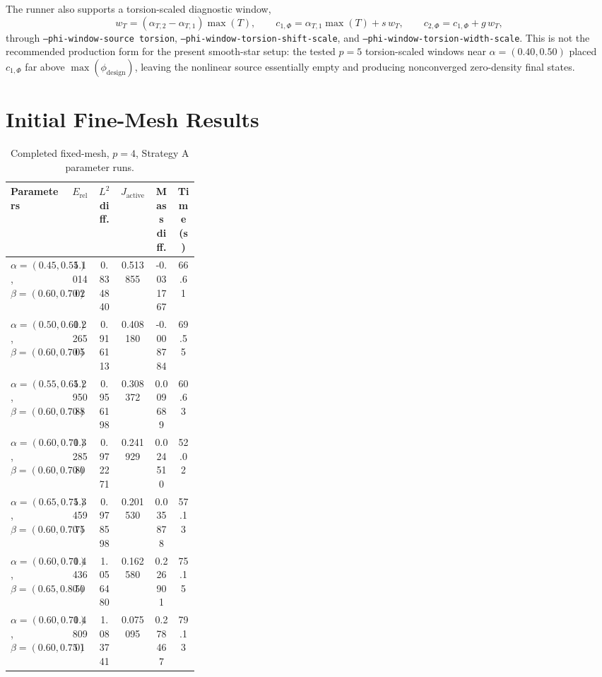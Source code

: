 \documentclass[11pt]{article}
\begin{document}
The runner also supports a torsion-scaled diagnostic window,
\[
w_T=(\alpha_{T,2}-\alpha_{T,1})\max(T),\qquad
c_{1,\Phi}=\alpha_{T,1}\max(T)+s\,w_T,\qquad
c_{2,\Phi}=c_{1,\Phi}+g\,w_T,
\]
through \texttt{--phi-window-source torsion},
\texttt{--phi-window-torsion-shift-scale}, and
\texttt{--phi-window-torsion-width-scale}.  This is not the recommended
production form for the present smooth-star setup: the tested \(p=5\)
torsion-scaled windows near \(\alpha=(0.40,0.50)\) placed \(c_{1,\Phi}\) far
above \(\max(\phi_{\mathrm{design}})\), leaving the nonlinear source
essentially empty and producing nonconverged zero-density final states.

\section{Initial Fine-Mesh Results}

\begin{table}[h]
\centering
\small
\begin{tabular}{@{}>{\raggedright\arraybackslash}p{0.31\linewidth}
                S[table-format=1.6]
                S[table-format=1.6]
                S[table-format=1.6]
                S[table-format=-1.6]
                S[table-format=2.2]@{}}
\toprule
Parameters & {$E_{\mathrm{rel}}$} & {$L^2$ diff.} & {$J_{\mathrm{active}}$} & {Mass diff.} & {Time (s)} \\
\midrule
\(\alpha=(0.45,0.55)\), \(\beta=(0.60,0.70)\) & 1.101402 & 0.834840 & 0.513855 & -0.031767 & 66.61 \\
\(\alpha=(0.50,0.60)\), \(\beta=(0.60,0.70)\) & 1.226505 & 0.916113 & 0.408180 & -0.008784 & 69.55 \\
\(\alpha=(0.55,0.65)\), \(\beta=(0.60,0.70)\) & 1.295088 & 0.956198 & 0.308372 & 0.009689 & 60.63 \\
\(\alpha=(0.60,0.70)\), \(\beta=(0.60,0.70)\) & 1.328580 & 0.972271 & 0.241929 & 0.024510 & 52.02 \\
\(\alpha=(0.65,0.75)\), \(\beta=(0.60,0.70)\) & 1.345975 & 0.978598 & 0.201530 & 0.035878 & 57.13 \\
\(\alpha=(0.60,0.70)\), \(\beta=(0.65,0.80)\) & 1.443650 & 1.056480 & 0.162580 & 0.226901 & 75.15 \\
\(\alpha=(0.60,0.70)\), \(\beta=(0.60,0.75)\) & 1.480901 & 1.083741 & 0.075095 & 0.278467 & 79.13 \\
\bottomrule
\end{tabular}
\caption{Completed fixed-mesh, \(p=4\), Strategy A parameter runs.}
\end{table}
\end{document}
